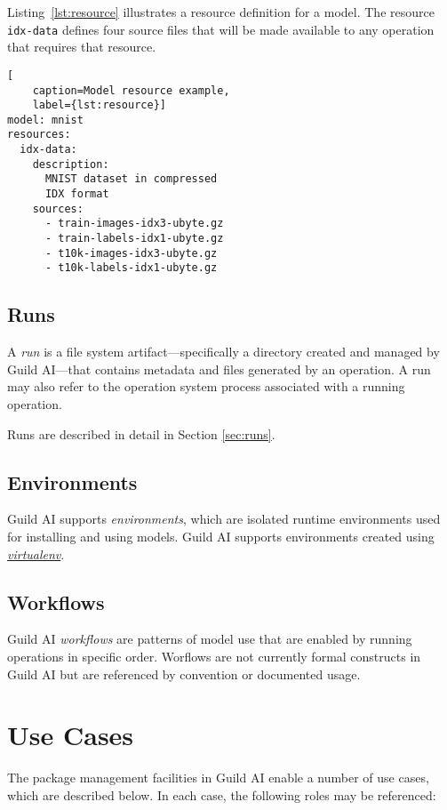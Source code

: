 \documentclass{article}
\begin{document}
Listing~\ref{lst:resource} illustrates a resource definition for a
model. The resource \verb|idx-data| defines four source files that
will be made available to any operation that requires that resource.

\begin{lstlisting}[
    caption=Model resource example,
    label={lst:resource}]
model: mnist
resources:
  idx-data:
    description:
      MNIST dataset in compressed
      IDX format
    sources:
      - train-images-idx3-ubyte.gz
      - train-labels-idx1-ubyte.gz
      - t10k-images-idx3-ubyte.gz
      - t10k-labels-idx1-ubyte.gz
\end{lstlisting}

\subsection{Runs}

A \emph{run} is a file system artifact---specifically a directory
created and managed by Guild AI---that contains metadata and files
generated by an operation. A run may also refer to the operation
system process associated with a running operation.

Runs are described in detail in Section \ref{sec:runs}.

\subsection{Environments}

Guild AI supports \emph{environments}, which are isolated runtime
environments used for installing and using models. Guild AI supports
environments created using
\href{https://virtualenv.pypa.io}{\emph{virtualenv}}.

\subsection{Workflows}

Guild AI \emph{workflows} are patterns of model use that are enabled
by running operations in specific order. Worflows are not currently
formal constructs in Guild AI but are referenced by convention or
documented usage.

\section{Use Cases}
\label{sec:use-cases}

The package management facilities in Guild AI enable a number of use
cases, which are described below. In each case, the following roles
may be referenced:
\end{document}
